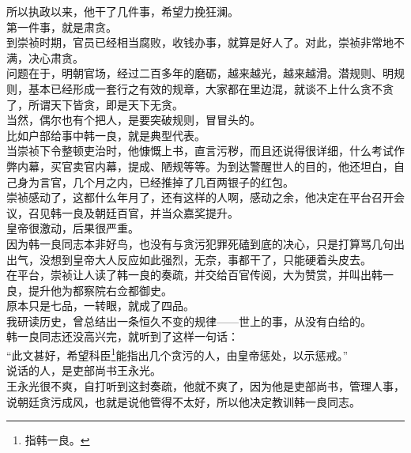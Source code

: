 \begin{multicols}{\theparacolNo}
所以执政以来，他干了几件事，希望力挽狂澜。\\

第一件事，就是肃贪。\\

到崇祯时期，官员已经相当腐败，收钱办事，就算是好人了。对此，崇祯非常地不满，决心肃贪。\\

问题在于，明朝官场，经过二百多年的磨砺，越来越光，越来越滑。潜规则、明规则，基本已经形成一套行之有效的规章，大家都在里边混，就谈不上什么贪不贪了，所谓天下皆贪，即是天下无贪。\\

当然，偶尔也有个把人，是要突破规则，冒冒头的。\\

比如户部给事中韩一良，就是典型代表。\\

当崇祯下令整顿吏治时，他慷慨上书，直言污秽，而且还说得很详细，什么考试作弊内幕，买官卖官内幕，提成、陋规等等。为到达警醒世人的目的，他还坦白，自己身为言官，几个月之内，已经推掉了几百两银子的红包。\\

崇祯感动了，这都什么年月了，还有这样的人啊，感动之余，他决定在平台召开会议，召见韩一良及朝廷百官，并当众嘉奖提升。\\

皇帝很激动，后果很严重。\\

因为韩一良同志本非好鸟，也没有与贪污犯罪死磕到底的决心，只是打算骂几句出出气，没想到皇帝大人反应如此强烈，无奈，事都干了，只能硬着头皮去。\\

在平台，崇祯让人读了韩一良的奏疏，并交给百官传阅，大为赞赏，并叫出韩一良，提升他为都察院右佥都御史。\\

原本只是七品，一转眼，就成了四品。\\

我研读历史，曾总结出一条恒久不变的规律——世上的事，从没有白给的。\\

韩一良同志还没高兴完，就听到了这样一句话：\\

“此文甚好，希望科臣\footnote{指韩一良。}能指出几个贪污的人，由皇帝惩处，以示惩戒。”\\

说话的人，是吏部尚书王永光。\\

王永光很不爽，自打听到这封奏疏，他就不爽了，因为他是吏部尚书，管理人事，说朝廷贪污成风，也就是说他管得不太好，所以他决定教训韩一良同志。\\


\end{multicols}
